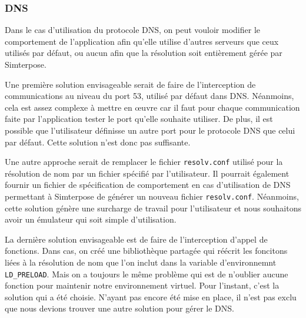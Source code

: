 \subsubsection{DNS}
 \label{section:DNS}

Dans le cas d'utilisation du protocole DNS, on peut vouloir modifier le
comportement de l'application afin qu'elle utilise d'autres serveurs que ceux
utilisés par défaut, ou aucun afin que la résolution soit entièrement gérée par
Simterpose. 

Une première solution envisageable serait de faire de l'interception de
communications au niveau du port 53, utilisé par défaut dans DNS. Néanmoins,
cela est assez complexe à mettre en \oe uvre car il faut pour chaque
communication faite par l'application tester le port qu'elle souhaite
utiliser. De plus, il est possible que l'utilisateur définisse un autre port
pour le protocole DNS que celui par défaut. Cette solution n'est donc pas
suffisante.

Une autre approche serait de remplacer le fichier \texttt{resolv.conf}
utilisé pour la résolution de nom par un fichier spécifié par
l'utilisateur. Il pourrait également fournir un fichier de
spécification de comportement en cas d'utilisation de DNS permettant
à Simterpose de générer un nouveau
fichier \texttt{resolv.conf}. Néanmoins, cette solution génère une
surcharge de travail pour l'utilisateur et nous souhaitons avoir un
émulateur qui soit simple d'utilisation.

La dernière solution envisageable est de faire de l'interception d'appel de
fonctions. Dans cas, on créé une bibliothèque partagée qui réécrit les foncitons
liées à la résolution de nom que l'on inclut dans la variable d'environnemnt
\texttt{LD\_PRELOAD}. Mais on a toujours le même problème qui est de n'oublier
aucune fonction pour maintenir notre environnement virtuel. Pour l'instant,
c'est la solution qui a été choisie. N'ayant pas encore été mise en place, il
n'est pas exclu que nous devions trouver une autre solution pour gérer le DNS.

\vspace{0.5cm}
